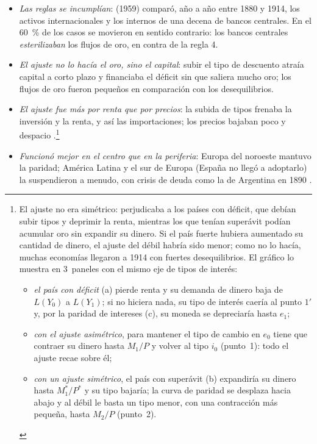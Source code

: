 \documentclass[11pt]{article}
\begin{document}
\begin{itemize}
\item \emph{Las reglas se incumplían}:  (1959) comparó, año a año entre 1880 y 1914, los activos internacionales y los internos de una decena de bancos centrales\nocite{Bloomfield1959Monetary}. En el 60~\% de los casos se movieron en sentido contrario: los bancos centrales \emph{esterilizaban} los flujos de oro, en contra de la regla 4.
\item \emph{El ajuste no lo hacía el oro, sino el capital}: subir el tipo de descuento atraía capital a corto plazo y financiaba el déficit sin que saliera mucho oro; los flujos de oro fueron pequeños en comparación con los desequilibrios.
\item \emph{El ajuste fue más por renta que por precios}: la subida de tipos frenaba la inversión y la renta, y así las importaciones; los precios bajaban poco y despacio .\footnote{El ajuste no era simétrico: perjudicaba a los países con déficit, que debían subir tipos y deprimir la renta, mientras los que tenían superávit podían acumular oro sin expandir su dinero. Si el país fuerte hubiera aumentado su cantidad de dinero, el ajuste del débil habría sido menor; como no lo hacía, muchas economías llegaron a 1914 con fuertes desequilibrios. El gráfico lo muestra en 3~paneles con el mismo eje de tipos de interés:
\begin{itemize}
\item \emph{el país con déficit} (a) pierde renta y su demanda de dinero baja de $L(Y_0)$ a $L(Y_1)$; si no hiciera nada, su tipo de interés caería al punto $1'$ y, por la paridad de intereses (c), su moneda se depreciaría hasta $e_1$;
\item \emph{con el ajuste asimétrico}, para mantener el tipo de cambio en $e_0$ tiene que contraer su dinero hasta $M_1/P$ y volver al tipo $i_0$ (punto~1): todo el ajuste recae sobre él;
\item \emph{con un ajuste simétrico}, el país con superávit (b) expandiría su dinero hasta $M^*_1/P^*$ y su tipo bajaría; la curva de paridad se desplaza hacia abajo y al débil le basta un tipo menor, con una contracción más pequeña, hasta $M_2/P$ (punto~2).
\end{itemize}}
\item \emph{Funcionó mejor en el centro que en la periferia}: Europa del noroeste mantuvo la paridad; América Latina y el sur de Europa (España no llegó a adoptarlo) la suspendieron a menudo, con crisis de deuda como la de Argentina en 1890 .
\end{itemize}
\end{document}
